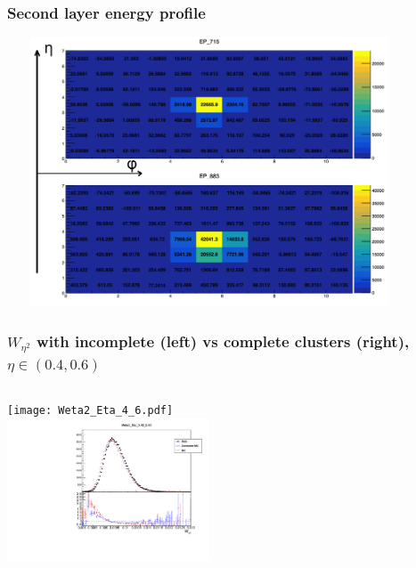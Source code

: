 \documentclass{beamer}
\begin{document}
\begin{frame}
\frametitle{Second layer energy profile}

\centering
\includegraphics[width=12cm,height=8cm]{Energy_Profile_15.png}\\
\end{frame}
\begin{frame}
\frametitle{$W_{\eta^2}$  with incomplete  (left) vs complete clusters (right), $\eta \in (0.4, 0.6)$ }

\begin{columns}[t]
\centering
\texttt{[image: Weta2\_Eta\_4\_6.pdf]}\\
\centering
\includegraphics[width=6cm]{Weta2_Eta_4_6_Athena.pdf}\\
\end{columns}
\end{frame}
\end{document}
